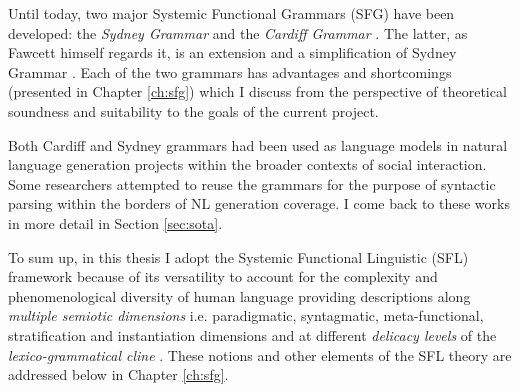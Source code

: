 % 
Until today, two major Systemic Functional Grammars (SFG) have been developed: the \textit{Sydney Grammar} \citep{Halliday2013} and the \textit{Cardiff Grammar} \citep{Fawcett2008}. The latter, as Fawcett himself regards it, is an extension and a simplification of Sydney Grammar \citep[xviii]{Fawcett2008}. Each of the two grammars has advantages and shortcomings (presented in Chapter \ref{ch:sfg}) which I discuss from the perspective of theoretical soundness and suitability to the goals of the current project.

Both Cardiff and Sydney grammars had been used as language models in natural language generation projects within 
the broader contexts of social interaction. Some researchers \citep{Kasper1988, ODonoghue1991a, ODonnell1993, Souter1996, Day2007} attempted to reuse the grammars for the purpose of syntactic parsing within the borders of NL generation coverage. I come back to these works in more detail in Section \ref{sec:sota}.


To sum up, in this thesis I adopt the Systemic Functional Linguistic (SFL) framework because of its versatility to account for the complexity and phenomenological diversity of human language providing descriptions along \textit{multiple semiotic dimensions} i.e. paradigmatic, syntagmatic, meta-functional, stratification and instantiation dimensions \citep{Halliday2003} and at different \textit{delicacy levels} of the \textit{lexico-grammatical cline} \citep{Halliday2002, Hasan2014}.  These notions and other elements of the SFL theory are addressed below in Chapter \ref{ch:sfg}.


